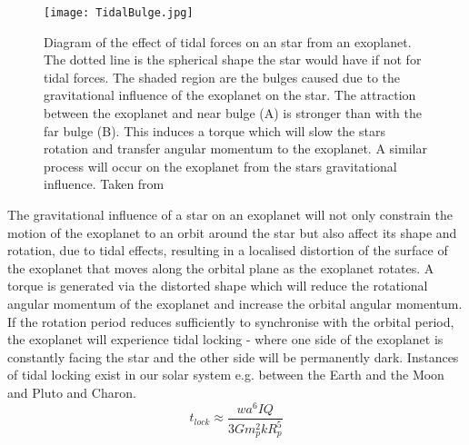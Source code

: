 \begin{figure}[t!]
\centering
\texttt{[image: TidalBulge.jpg]}
\caption{Diagram of the effect of tidal forces on an star from an exoplanet. The dotted line is the spherical shape the star would have if not for tidal forces. The shaded region are the bulges caused due to the gravitational influence of the exoplanet on the star. The attraction between the exoplanet and near bulge (A) is stronger than with the far bulge (B). This induces a torque which will slow the stars rotation and transfer angular momentum to the exoplanet. A similar process will occur on the exoplanet from the stars gravitational influence. Taken from \citet{2011Perryman}}
\label{FigTidal}
\end{figure}
The gravitational influence of a star on an exoplanet will not only constrain the motion of the exoplanet to an orbit around the star but also affect its shape and rotation, due to tidal effects, resulting in a localised distortion of the surface of the exoplanet that moves along the orbital plane as the exoplanet rotates. A torque is generated via the distorted shape which will reduce the rotational angular momentum of the exoplanet and increase the orbital angular momentum. If the rotation period reduces sufficiently to synchronise with the orbital period, the exoplanet will experience tidal locking - where one side of the exoplanet is constantly facing the star and the other side will be permanently dark. Instances of tidal locking exist in our solar system e.g. between the Earth and the Moon and Pluto and Charon.\\
\begin{equation}
t_{lock} \approx \frac{wa^6IQ}{3Gm_p^2kR_p^5}
\label{EqTidal}
\end{equation}
